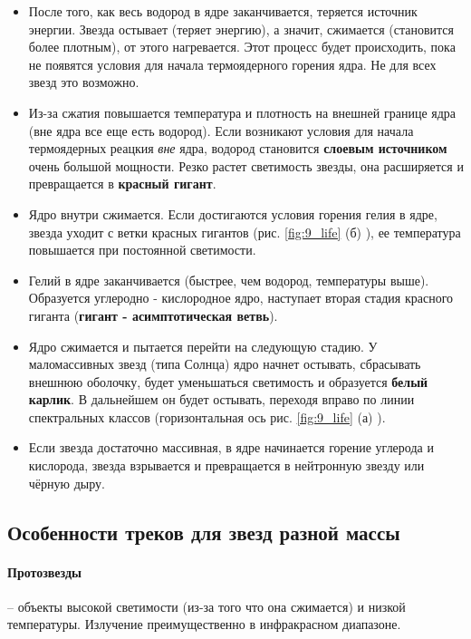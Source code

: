 \begin{itemize}
    
    \item После того, как весь водород в ядре заканчивается, теряется источник энергии. Звезда остывает (теряет энергию), а значит, сжимается (становится более плотным), от этого нагревается. Этот процесс будет происходить, пока не появятся условия для начала термоядерного горения ядра. Не для всех звезд это возможно. 
    
    \item Из-за сжатия повышается температура и плотность на внешней границе ядра (вне ядра все еще есть водород). Если возникают условия для начала термоядерных реацкия \textit{вне} ядра, водород становится \textbf{слоевым источником} очень большой мощности. Резко растет светимость звезды, она расширяется и превращается в \textbf{красный гигант}.
    
    \item Ядро внутри сжимается. Если достигаются условия горения гелия в ядре, звезда уходит с ветки красных гигантов (рис. \ref{fig:9_life} (б) ), ее температура повышается при постоянной светимости.
    
    \item Гелий в ядре заканчивается (быстрее, чем водород, температуры выше). Образуется углеродно - кислородное ядро, наступает вторая стадия красного гиганта (\textbf{гигант - асимптотическая ветвь}).
    
    \item Ядро сжимается и пытается перейти на следующую стадию. У маломассивных звезд (типа Солнца) ядро начнет остывать, сбрасывать внешнюю оболочку, будет уменьшаться светимость и образуется \textbf{белый карлик}. В дальнейшем он будет остывать, переходя вправо по линии спектральных классов (горизонтальная ось рис. \ref{fig:9_life} (а) ).
    
    \item Если звезда достаточно массивная, в ядре начинается горение углерода и кислорода, звезда взрывается и превращается в нейтронную звезду или чёрную дыру.
    
\end{itemize}

\newpage

\subsection{Особенности треков для звезд разной массы}

\paragraph{Протозвезды} -- объекты высокой светимости (из-за того что она сжимается) и низкой температуры. Излучение преимущественно в инфракрасном диапазоне.

